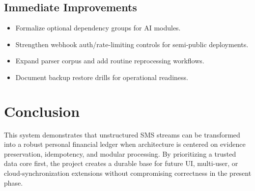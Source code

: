 \documentclass[12pt,a4paper]{article}
\begin{document}
\subsection{Immediate Improvements}
\begin{itemize}[leftmargin=1.5em]
  \item Formalize optional dependency groups for AI modules.
  \item Strengthen webhook auth/rate-limiting controls for semi-public deployments.
  \item Expand parser corpus and add routine reprocessing workflows.
  \item Document backup restore drills for operational readiness.
\end{itemize}

\section{Conclusion}
This system demonstrates that unstructured SMS streams can be transformed into a robust personal financial ledger when architecture is centered on evidence preservation, idempotency, and modular processing. By prioritizing a trusted data core first, the project creates a durable base for future UI, multi-user, or cloud-synchronization extensions without compromising correctness in the present phase.
\end{document}
